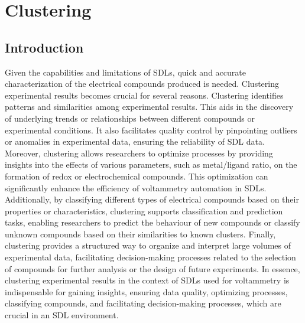\chapter{Clustering} \label{chap:chap-2}







\section{Introduction}
Given the capabilities and limitations of SDLs, quick and accurate characterization of the electrical compounds produced is needed. Clustering experimental results becomes crucial for several reasons. 
Clustering identifies patterns and similarities among experimental results. This aids in the discovery of underlying trends or relationships between different compounds or experimental conditions. It also facilitates quality control by pinpointing outliers or anomalies in experimental data, ensuring the reliability of SDL data. 
Moreover, clustering allows researchers to optimize processes by providing insights into the effects of various parameters, such as metal/ligand ratio, on the formation of redox or electrochemical compounds. This optimization can significantly enhance the efficiency of voltammetry automation in SDLs. Additionally, by classifying different types of electrical compounds based on their properties or characteristics, clustering supports classification and prediction tasks, enabling researchers to predict the behaviour of new compounds or classify unknown compounds based on their similarities to known clusters.
Finally, clustering provides a structured way to organize and interpret large volumes of experimental data, facilitating decision-making processes related to the selection of compounds for further analysis or the design of future experiments. In essence, clustering experimental results in the context of SDLs used for voltammetry is indispensable for gaining insights, ensuring data quality, optimizing processes, classifying compounds, and facilitating decision-making processes, which are crucial in an SDL environment.
